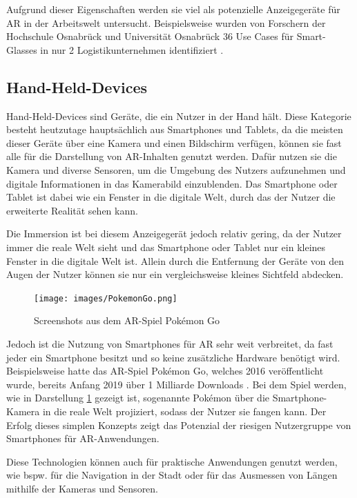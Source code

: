     Aufgrund dieser Eigenschaften werden sie viel als potenzielle Anzeigegeräte für AR in der Arbeitswelt untersucht.
    Beispielsweise wurden von Forschern der Hochschule Osnabrück und Universität Osnabrück 36 Use Cases für Smart-Glasses in nur 2 Logistikunternehmen identifiziert \autocite[]{SmartGlasses2017}.


  \subsection{Hand-Held-Devices}

  Hand-Held-Devices sind Geräte, die ein Nutzer in der Hand hält.
  Diese Kategorie besteht heutzutage hauptsächlich aus Smartphones und Tablets, da die meisten dieser Geräte über eine Kamera und einen Bildschirm verfügen, können sie fast alle für die Darstellung von AR-Inhalten genutzt werden.
  Dafür nutzen sie die Kamera und diverse Sensoren, um die Umgebung des Nutzers aufzunehmen und digitale Informationen in das Kamerabild einzublenden.
  Das Smartphone oder Tablet ist dabei wie ein Fenster in die digitale Welt, durch das der Nutzer die erweiterte Realität sehen kann.

  Die Immersion ist bei diesem Anzeigegerät jedoch relativ gering, da der Nutzer immer die reale Welt sieht und das Smartphone oder Tablet nur ein kleines Fenster in die digitale Welt ist.
  Allein durch die Entfernung der Geräte von den Augen der Nutzer können sie nur ein vergleichsweise kleines Sichtfeld abdecken.

  \begin{figure}[H]
    \centering
    \texttt{[image: images/PokemonGo.png]}
    \caption{Screenshots aus dem AR-Spiel Pok\'emon Go}
    \label{fig:pokemon-go}
  \end{figure}

  Jedoch ist die Nutzung von Smartphones für AR sehr weit verbreitet, da fast jeder ein Smartphone besitzt und so keine zusätzliche Hardware benötigt wird.
  Beispielsweise hatte das AR-Spiel Pok\'emon Go, welches 2016 veröffentlicht wurde, bereits Anfang 2019 über 1 Milliarde Downloads \autocite[][]{pokemon-go-stats}.
  Bei dem Spiel werden, wie in Darstellung \ref*{fig:pokemon-go} gezeigt ist, sogenannte Pok\'emon über die Smartphone-Kamera in die reale Welt projiziert, sodass der Nutzer sie fangen kann.
  Der Erfolg dieses simplen Konzepts zeigt das Potenzial der riesigen Nutzergruppe von Smartphones für AR-Anwendungen.

  Diese Technologien können auch für praktische Anwendungen genutzt werden, wie bspw. für die Navigation in der Stadt oder für das Ausmessen von Längen mithilfe der Kameras und Sensoren.

